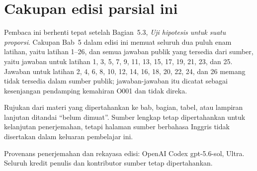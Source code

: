 \documentclass[10pt,openany]%
{book}
\date{}
\begin{document}
%
\renewcommand{\thepage}{}
\maketitle

\renewcommand{\thepage}{\arabic{page}}
\tableofcontents

\normalsize

\chapter*{Cakupan edisi parsial ini}
Pembaca ini berhenti tepat setelah Bagian~5.3,
\emph{Uji hipotesis untuk suatu proporsi}. Cakupan Bab~5 dalam edisi ini
memuat seluruh dua puluh enam latihan, yaitu latihan 1--26, dan semua
jawaban publik yang tersedia dari sumber, yaitu jawaban untuk latihan
1, 3, 5, 7, 9, 11, 13, 15, 17, 19, 21, 23, dan 25. Jawaban untuk latihan
2, 4, 6, 8, 10, 12, 14, 16, 18, 20, 22, 24, dan 26 memang tidak tersedia
dalam sumber publik; jawaban-jawaban itu dicatat sebagai kesenjangan
pendamping kemahiran O001 dan tidak direka.

Rujukan dari materi yang dipertahankan ke bab, bagian, tabel, atau lampiran
lanjutan ditandai ``belum dimuat''. Sumber lengkap tetap dipertahankan untuk
kelanjutan penerjemahan, tetapi halaman sumber berbahasa Inggris tidak
disertakan dalam keluaran pembelajar ini.

Provenans penerjemahan dan rekayasa edisi: OpenAI Codex gpt-5.6-sol, Ultra.
Seluruh kredit penulis dan kontributor sumber tetap dipertahankan.

\begingroup
\makeatletter
\def\@currentlabel{belum dimuat}
\label{ch_regr_mult_and_log}
\label{oneSampleMeansWithTDistribution}
\label{ch_regr_simple_linear}
\label{appendix_data}
\label{linRegrForTwoVar}
\label{normalProbabilityTable}
\label{multipleAndLogisticRegression}
\makeatother
\endgroup

\begingroup

%
\setcounter{chapter}{1}
\addtocounter{chapter}{-1}
\normalsize


\setcounter{chapter}{2}
\addtocounter{chapter}{-1}
\normalsize


\setcounter{chapter}{3}
\addtocounter{chapter}{-1}
\normalsize

\setcounter{chapter}{4}
\addtocounter{chapter}{-1}
\normalsize

\setcounter{chapter}{5}
\addtocounter{chapter}{-1}
\normalsize

\endgroup

\begingroup

\appendix{}
\endgroup
\end{document}
